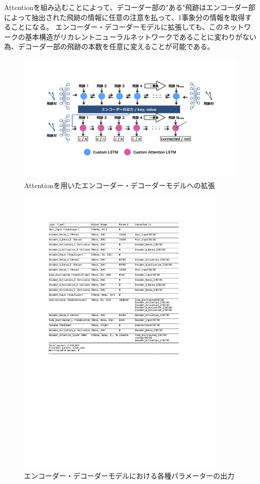 Attentionを組み込むことによって、デコーダー部の"ある"飛跡はエンコーダー部によって抽出された飛跡の情報に任意の注意を払って、1事象分の情報を取得することになる。
エンコーダー・デコーダーモデルに拡張しても、このネットワークの基本構造がリカレントニューラルネットワークであることに変わりがない為、デコーダー部の飛跡の本数を任意に変えることが可能である。

\begin{figure}[h]
 \centering
 \includegraphics[trim = 0 80 0 0, width=1.0\textwidth]{Figure/3Networks/3-4-1-2EncoderDecoderVLSTM.png}
 \caption{Attentionを用いたエンコーダー・デコーダーモデルへの拡張}
 \label{3-4-1-2EncoderDecoderVLSTM}
\end{figure}

\begin{figure}[h]
 \centering
 \includegraphics[trim = 75 300 125 0, width=0.9\textwidth]{Figure/3Networks/3-4-1-3VLSTMSummary.png}
 \caption{エンコーダー・デコーダーモデルにおける各種パラメーターの出力}
 \label{3-4-1-3VLSTMSummary}
\end{figure}


